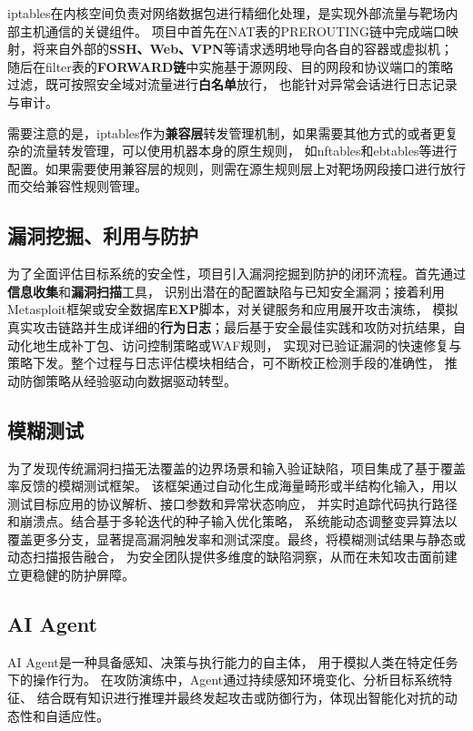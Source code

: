 \documentclass[lang=cn,10pt]{elegantbook}
\begin{document}
iptables在内核空间负责对网络数据包进行精细化处理，是实现外部流量与靶场内部主机通信的关键组件。
项目中首先在NAT表的PREROUTING链中完成端口映射，将来自外部的\textbf{SSH、Web、VPN}等请求透明地导向各自的容器或虚拟机；
随后在filter表的\textbf{FORWARD链}中实施基于源网段、目的网段和协议端口的策略过滤，既可按照安全域对流量进行\textbf{白名单}放行，
也能针对异常会话进行日志记录与审计。

需要注意的是，iptables作为\textbf{兼容层}转发管理机制，如果需要其他方式的或者更复杂的流量转发管理，可以使用机器本身的原生规则，
如nftables和ebtables等进行配置。如果需要使用兼容层的规则，则需在源生规则层上对靶场网段接口进行放行而交给兼容性规则管理。


\subsection{漏洞挖掘、利用与防护}
为了全面评估目标系统的安全性，项目引入漏洞挖掘到防护的闭环流程。首先通过\textbf{信息收集}和\textbf{漏洞扫描}工具，
识别出潜在的配置缺陷与已知安全漏洞；接着利用Metasploit框架或安全数据库\textbf{EXP}脚本，对关键服务和应用展开攻击演练，
模拟真实攻击链路并生成详细的\textbf{行为日志}；最后基于安全最佳实践和攻防对抗结果，自动化地生成补丁包、访问控制策略或WAF规则，
实现对已验证漏洞的快速修复与策略下发。整个过程与日志评估模块相结合，可不断校正检测手段的准确性，
推动防御策略从经验驱动向数据驱动转型。

\subsection{模糊测试}
为了发现传统漏洞扫描无法覆盖的边界场景和输入验证缺陷，项目集成了基于覆盖率反馈的模糊测试框架。
该框架通过自动化生成海量畸形或半结构化输入，用以测试目标应用的协议解析、接口参数和异常状态响应，
并实时追踪代码执行路径和崩溃点。结合基于多轮迭代的种子输入优化策略，
系统能动态调整变异算法以覆盖更多分支，显著提高漏洞触发率和测试深度。最终，将模糊测试结果与静态或动态扫描报告融合，
为安全团队提供多维度的缺陷洞察，从而在未知攻击面前建立更稳健的防护屏障。


\subsection{AI Agent}

AI Agent是一种具备感知、决策与执行能力的自主体，
用于模拟人类在特定任务下的操作行为。
在攻防演练中，Agent通过持续感知环境变化、分析目标系统特征、
结合既有知识进行推理并最终发起攻击或防御行为，体现出智能化对抗的动态性和自适应性。
\end{document}
